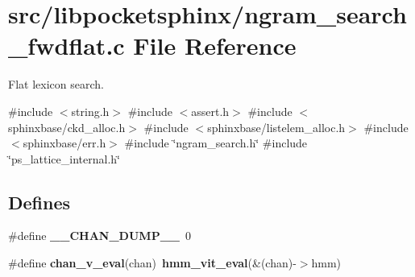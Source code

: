 \section{src/libpocketsphinx/ngram\-\_\-search\-\_\-fwdflat.c \-File \-Reference}
\label{ngram__search__fwdflat_8c}


\-Flat lexicon search.  


{\ttfamily \#include $<$string.\-h$>$}\*
{\ttfamily \#include $<$assert.\-h$>$}\*
{\ttfamily \#include $<$sphinxbase/ckd\-\_\-alloc.\-h$>$}\*
{\ttfamily \#include $<$sphinxbase/listelem\-\_\-alloc.\-h$>$}\*
{\ttfamily \#include $<$sphinxbase/err.\-h$>$}\*
{\ttfamily \#include \char`\"{}ngram\-\_\-search.\-h\char`\"{}}\*
{\ttfamily \#include \char`\"{}ps\-\_\-lattice\-\_\-internal.\-h\char`\"{}}\*
\subsection*{\-Defines}
\begin{DoxyCompactItemize}
\item 
\#define {\bfseries \-\_\-\-\_\-\-C\-H\-A\-N\-\_\-\-D\-U\-M\-P\-\_\-\-\_\-}~0\label{ngram__search__fwdflat_8c_a58360b0a332f35742f89edce94c649aa}

\item 
\#define {\bfseries chan\-\_\-v\-\_\-eval}(chan)~{\bf hmm\-\_\-vit\-\_\-eval}(\&(chan)-\/$>$hmm)\label{ngram__search__fwdflat_8c_a268c1fbc6483e1ab06c007222f08d9ad}

\end{DoxyCompactItemize}
